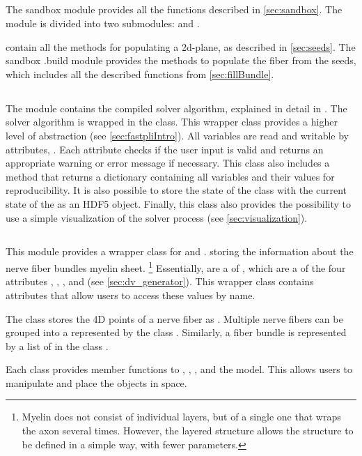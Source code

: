 \subsection{}
%
The sandbox module provides all the functions described in \cref{sec:sandbox}.
The module is divided into two submodules:  and .
\par
%
 contain all the methods for populating a 2d-plane, as described in \cref{sec:seeds}.
The sandbox .build module provides the methods to populate the fiber from the seeds, which includes all the described functions from \cref{sec:fillBundle}.
%
%
%
\subsection{}
%
The module  contains the compiled solver algorithm, explained in detail in .
The solver algorithm is wrapped in the  class.
This wrapper class provides a higher level of abstraction (see \cref{sec:fastpliIntro}).
All variables are read and writable by attributes, \eg{} .
Each attribute checks if the user input is valid and returns an appropriate warning or error message if necessary.
This class also includes a  method that returns a \python{} dictionary containing all variables and their values for reproducibility.
It is also possible to store the state of the class with the current state of the  as an \ac{HDF5} object.
Finally, this class also provides the possibility to use a simple visualization of the solver process (see \cref{sec:visualization}).
%
%
%
\subsection{}
%
This module provides a wrapper class for  and .
 storing the information about the nerve fiber bundles myelin sheet. \footnote{Myelin does not consist of individual layers, but of a single one that wraps the axon several times. However, the layered structure allows the structure to be defined in a simple way, with fewer parameters.}
Essentially,  are a  of , which are a  of the four attributes , , , and  (see \cref{sec:dv_generator}).
This wrapper class contains attributes that allow users to access these values by name.
\par
%
The class  stores the 4D points of a nerve fiber as .
Multiple nerve fibers can be grouped into a  represented by the class .
Similarly, a fiber bundle is represented by a list of  in the class .
\par
%
Each class provides member functions to , , , and  the model.
This allows users to manipulate and place the objects in space.
%
%
%
